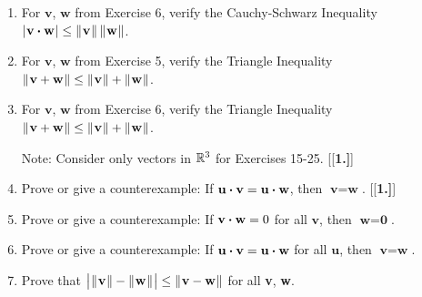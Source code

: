 \begin{enumerate}[\bfseries 1.]
  $\abs{\Dotprod{\textbf{v}}{\textbf{w}}} \le \norm{\textbf{v}}\,\norm{\textbf{w}}$.
 \item For $\textbf{v}$, $\textbf{w}$ from Exercise 6, verify the Cauchy-Schwarz Inequality
  $\abs{\Dotprod{\textbf{v}}{\textbf{w}}} \le \norm{\textbf{v}}\,\norm{\textbf{w}}$.
 \item For $\textbf{v}$, $\textbf{w}$ from Exercise 5, verify the Triangle Inequality
  $\lVert\mspace{1mu}\textbf{v} + \textbf{w}\mspace{1mu}\rVert \le \lVert\mspace{1mu}\textbf{v}\mspace{1mu}\rVert + \lVert\mspace{1mu}\textbf{w}\mspace{1mu}\rVert$.
 \item For $\textbf{v}$, $\textbf{w}$ from Exercise 6, verify the Triangle Inequality
  $\lVert\mspace{1mu}\textbf{v} + \textbf{w}\mspace{1mu}\rVert \le \lVert\mspace{1mu}\textbf{v}\mspace{1mu}\rVert + \lVert\mspace{1mu}\textbf{w}\mspace{1mu}\rVert$.
\vspace{1mm}
\par\noindent Note: Consider only vectors in $\mathbb{R}^{3}$ for Exercises 15-25.\vspace{1mm}
[{[\bfseries 1.]}]
 \item Prove or give a counterexample: If $\textbf{u} \bm{\cdot} \textbf{v} = \textbf{u} \bm{\cdot} \textbf{w}$,
  then $\textbf{v} =\textbf{w}$.
[{[\bfseries 1.]}]
 \item Prove or give a counterexample: If $\textbf{v} \bm{\cdot} \textbf{w} = 0$ for all $\textbf{v}$, then
  $\textbf{w} =\textbf{0}$.
 \item Prove or give a counterexample: If $\textbf{u} \bm{\cdot} \textbf{v} = \textbf{u} \bm{\cdot} \textbf{w}$
  for all $\textbf{u}$, then $\textbf{v} =\textbf{w}$.
 \item Prove that $\bigl\lvert\mspace{1mu}\lVert\mspace{1mu}\textbf{v}\mspace{1mu}\rVert - \lVert\mspace{1mu}\textbf{w}\mspace{1mu}\rVert\mspace{1mu}\bigr\rvert \le \lVert\mspace{1mu}\textbf{v} - \textbf{w}\mspace{1mu}\rVert$ for all
  \textbf{v}, \textbf{w}.


\end{enumerate}
